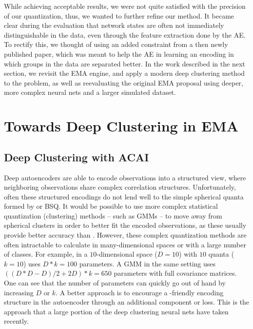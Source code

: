 			While achieving acceptable results, we were not quite satisfied with the precision of our quantization, thus, we wanted to further refine our method.
			It became clear during the evaluation that network states are often not immediately distinguishable in the data, even through the feature extraction done by the \ac{AE}.
			To rectify this, we thought of using an added constraint from a then newly published paper, which was meant to help the \ac{AE} in learning an encoding in which groups in the data are separated better.
			In the work described in the next section, we revisit the \ac{EMA} engine, and apply a modern deep clustering method to the problem, as well as reevaluating the original \ac{EMA} proposal using deeper, more complex neural nets and a larger simulated dataset.			

	\section{Towards Deep Clustering in EMA}
		\label{cha:ema:sec:ema_acai}
	
		\subsection{Deep Clustering with ACAI}
			
			Deep autoencoders are able to encode observations into a structured view, where neighboring observations share complex correlation structures.
			Unfortunately, often these structured encodings do not lend well to the simple spherical quanta formed by \kmeans{} or \ac{BSQ}.
			It would be possible to use more complex statistical quantization (clustering) methods -- such as \acp{GMM} -- to move away from spherical clusters in order to better fit the encoded observations, as these usually provide better accuracy than \kmeans{}.
			However, these complex quantization methods are often intractable to calculate in many-dimensional spaces or with a large number of classes.
			For example, \kmeans{} in a $10$-dimensional space ($D = 10$) with $10$ quanta ($k = 10$) uses $D*k = 100$ parameters. 
			A \ac{GMM} in the same setting uses $((D*D - D)/2 + 2D) * k = 650$ parameters with full covariance matrices. 
			One can see that the number of parameters can quickly go out of hand by increasing $D$ or $k$. 
			A better approach is to encourage a \kmeans{}-friendly encoding structure in the autoencoder through an additional component or loss. 
			This is the approach that a large portion of the deep clustering neural nets have taken recently.
			
